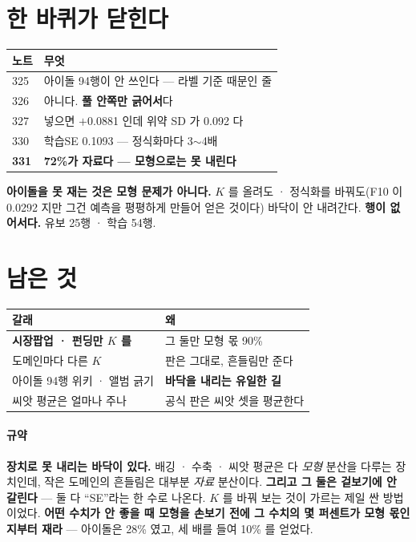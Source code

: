 \documentclass[10pt]{article}
\begin{document}
\section{한 바퀴가 닫힌다}

\begin{center}\footnotesize
\begin{tabular}{ll}
\hline
노트 & 무엇 \\
\hline
325 & 아이돌 94행이 안 쓰인다 --- 라벨 기준 때문인 줄 \\
326 & 아니다. \textbf{풀 안쪽만 긁어서}다 \\
327 & 넣으면 $+$0.0881 인데 위약 SD 가 0.092 다 \\
330 & 학습SE 0.1093 --- 정식화마다 3$\sim$4배 \\
\textbf{331} & \textbf{72\%가 자료다 --- 모형으로는 못 내린다} \\
\hline
\end{tabular}
\end{center}

\textbf{아이돌을 못 재는 것은 모형 문제가 아니다.} $K$ 를 올려도 · 정식화를
바꿔도(F10 이 0.0292 지만 그건 예측을 평평하게 만들어 얻은 것이다) 바닥이
안 내려간다. \textbf{행이 없어서다.} 유보 25행 · 학습 54행.

\section{남은 것}
\begin{center}\footnotesize
\begin{tabular}{ll}
\hline
갈래 & 왜 \\
\hline
\textbf{시장팝업 · 펀딩만 $K$ 를} & 그 둘만 모형 몫 90\% \\
도메인마다 다른 $K$ & 판은 그대로, 흔들림만 준다 \\
아이돌 94행 위키 · 앨범 긁기 & \textbf{바닥을 내리는 유일한 길} \\
씨앗 평균은 얼마나 주나 & 공식 판은 씨앗 셋을 평균한다 \\
\hline
\end{tabular}
\end{center}

\paragraph{규약} \textbf{장치로 못 내리는 바닥이 있다.} 배깅 · 수축 ·
씨앗 평균은 다 \emph{모형} 분산을 다루는 장치인데, 작은 도메인의 흔들림은
대부분 \emph{자료} 분산이다. \textbf{그리고 그 둘은 겉보기에 안 갈린다}
--- 둘 다 ``SE''라는 한 수로 나온다. $K$ 를 바꿔 보는 것이 가르는 제일 싼
방법이었다. \textbf{어떤 수치가 안 좋을 때 모형을 손보기 전에 그 수치의
몇 퍼센트가 모형 몫인지부터 재라} --- 아이돌은 28\% 였고, 세 배를 들여
10\% 를 얻었다.
\end{document}
